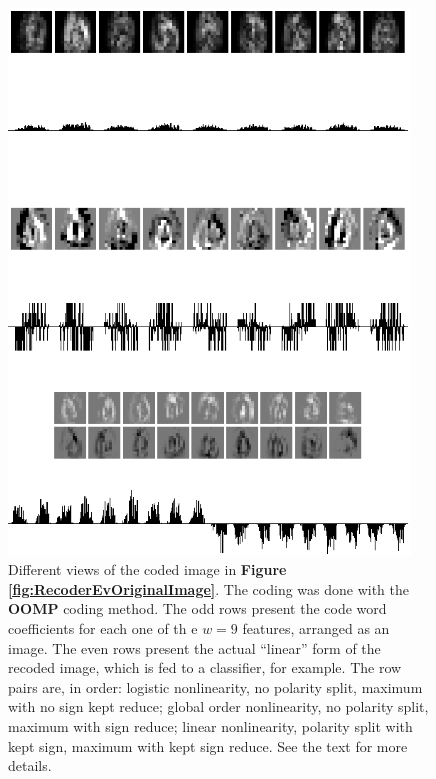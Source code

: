 \documentclass[12pt,a4paper,oneside,english]{UPBThesis}
\begin{document}
\begin{figure}
\centering
\includegraphics[width=0.95\textwidth,height=0.8\textheight]{thesis_data/recoderev/coded_partial_oomp.png}
\caption{Different views of the coded image in \textbf{Figure \ref{fig:RecoderEvOriginalImage}}. The coding was done with the \textbf{OOMP} coding method. The odd rows present the code word coefficients for each one of th e $w=9$ features, arranged as an image. The even rows present the actual ``linear'' form of the recoded image, which is fed to a classifier, for example. The row pairs are, in order: logistic nonlinearity, no polarity split, maximum with no sign kept reduce; global order nonlinearity, no polarity split, maximum with sign reduce; linear nonlinearity, polarity split with kept sign, maximum with kept sign reduce. See the text for more details.}
\label{fig:RecoderEvRecodingExamplesOOMP}
\end{figure}
\end{document}
